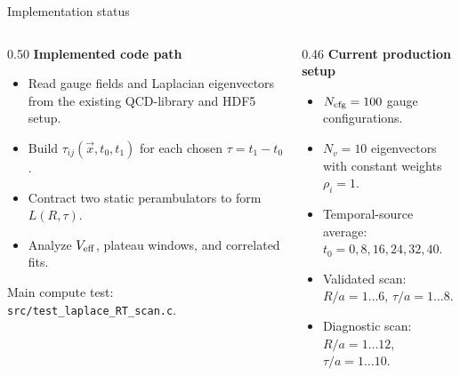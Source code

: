 \documentclass[11pt,rgb,ratio=169]{beamer}
\newcommand{\tightitems}{\setlength\itemsep{0.28em}\setlength\parskip{0pt}}
\begin{document}
\begin{frame}{Implementation status}
\begin{columns}[T,totalwidth=\textwidth]
\begin{column}{0.50\textwidth}
\textbf{Implemented code path}\vspace{0.2em}
\begin{itemize}\tightitems
  \item Read gauge fields and Laplacian eigenvectors from the existing QCD-library and HDF5 setup.
  \item Build $\tau_{ij}(\vec x,t_0,t_1)$ for each chosen $\tau=t_1-t_0$.
  \item Contract two static perambulators to form $L(R,\tau)$.
  \item Analyze $V_{\rm eff}$, plateau windows, and correlated fits.
\end{itemize}
\vspace{0.35em}
{\scriptsize Main compute test: \texttt{src/test\_laplace\_RT\_scan.c}.}
\end{column}
\begin{column}{0.46\textwidth}
\textbf{Current production setup}\vspace{0.2em}
\begin{itemize}\tightitems
  \item $N_{\rm cfg}=100$ gauge configurations.
  \item $N_v=10$ eigenvectors with constant weights $\rho_i=1$.
  \item Temporal-source average:
  $t_0=0,8,16,24,32,40$.
  \item Validated scan:
  $R/a=1\ldots 6$, $\tau/a=1\ldots 8$.
  \item Diagnostic scan:
  $R/a=1\ldots 12$, $\tau/a=1\ldots 10$.
\end{itemize}
\end{column}
\end{columns}
\end{frame}
\end{document}
